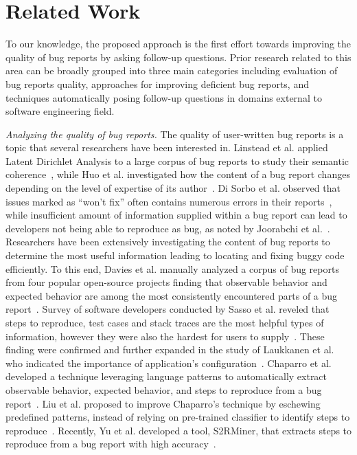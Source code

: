 \section{Related Work}
To our knowledge, the proposed approach is the first effort towards improving the quality of bug reports by asking follow-up questions. Prior research related to this area can be broadly grouped into three main categories including evaluation of bug reports quality, approaches for improving deficient bug reports, and techniques automatically posing follow-up questions in domains external to software engineering field.

\noindent
{\em Analyzing the quality of bug reports.} The quality of user-written bug reports is a topic that several researchers have been interested in. Linstead et al. applied Latent Dirichlet Analysis to a large corpus of bug reports to study their semantic coherence~\cite{linstead09mining}, while Huo et al. investigated how the  content of a bug report changes depending on the level of expertise of its author~\cite{Huo2014AnES}. Di Sorbo et al. observed that issues marked as ``won't fix'' often contains numerous errors in their reports~\cite{Sorbo2019WontWF}, while insufficient amount of information supplied within a bug report can lead to developers not being able to reproduce as bug, as noted by Joorabchi et al.~\cite{erfani2014works}.
Researchers have been extensively investigating the content of bug reports to determine the most useful information leading to locating and fixing buggy code efficiently.
To this end, Davies et al. manually analyzed a corpus of bug reports from four popular open-source projects finding that observable behavior and expected behavior are among the most consistently encountered parts of a bug report~\cite{davies14whats}. Survey of software developers conducted by Sasso et al. reveled that steps to reproduce, test cases and stack traces are the most helpful types of information, however they were also the hardest for users to supply~\cite{sasso2016satisficing}. These finding were confirmed and further expanded in the study of Laukkanen et al. who indicated the importance of application's configuration~\cite{laukkanen2011survey}. Chaparro et al. developed a technique leveraging language patterns to automatically extract observable behavior, expected behavior, and steps to reproduce from a bug report~\cite{chaparro17detecting}. Liu et al. proposed to improve Chaparro's technique by eschewing predefined patterns, instead of relying on pre-trained classifier to identify steps to reproduce~\cite{liu2020automated}. Recently, Yu et al. developed a tool, S2RMiner, that extracts steps to reproduce from a bug report with high accuracy~\cite{yu2019s2rminer}.
